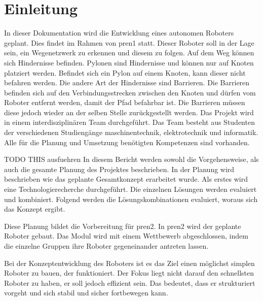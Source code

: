 \section{Einleitung}

In dieser Dokumentation wird die Entwicklung eines autonomen Roboters geplant. Dies findet im Rahmen von \acrfull{pren1} statt. Dieser Roboter soll in der Lage sein, ein Wegenetzwerk zu erkennen und diesem zu folgen. Auf dem Weg können sich Hindernisse befinden. Pylonen sind Hindernisse und können nur auf Knoten platziert werden. Befindet sich ein Pylon auf einem Knoten, kann dieser nicht befahren werden. Die andere Art der Hindernisse sind Barrieren. Die Barrieren befinden sich auf den Verbindungsstrecken zwischen den Knoten und dürfen vom Roboter entfernt werden, damit der Pfad befahrbar ist. Die Barrieren müssen diese jedoch wieder an der selben Stelle zurückgestellt werden.
Das Projekt wird in einem interdisziplinären Team durchgeführt. Das Team besteht aus Studenten der verschiedenen Studiengänge \acrfull{maschinentechnik}, \acrfull{elektrotechnik} und \acrfull{informatik}. Alle für die Planung und Umsetzung benötigten Kompetenzen sind vorhanden.

TODO THIS ausfuehren
In diesem Bericht werden sowohl die Vorgehensweise, als auch die gesamte Planung des Projektes beschrieben. In der Planung wird beschrieben wie das geplante Gesamtkonzept erarbeitet wurde. Als erstes wird eine Technologierecherche durchgeführt. Die einzelnen Lösungen werden evaluiert und kombiniert. Folgend werden die Lösungskombinationen evaluiert, woraus sich das Konzept ergibt.

Diese Planung bildet die Vorbereitung für \acrfull{pren2}. In \acrshort{pren2} wird der geplante Roboter gebaut. Das Modul wird mit einem Wettbewerb abgeschlossen, indem die einzelne Gruppen ihre Roboter gegeneinander antreten lassen.

Bei der Konzeptentwicklung des Roboters ist es das Ziel einen möglichst simplen Roboter zu bauen, der funktioniert. Der Fokus liegt nicht darauf den schnellsten Roboter zu haben, er soll jedoch effizient sein. Das bedeutet, dass er strukturiert vorgeht und sich stabil und sicher fortbewegen kann.

